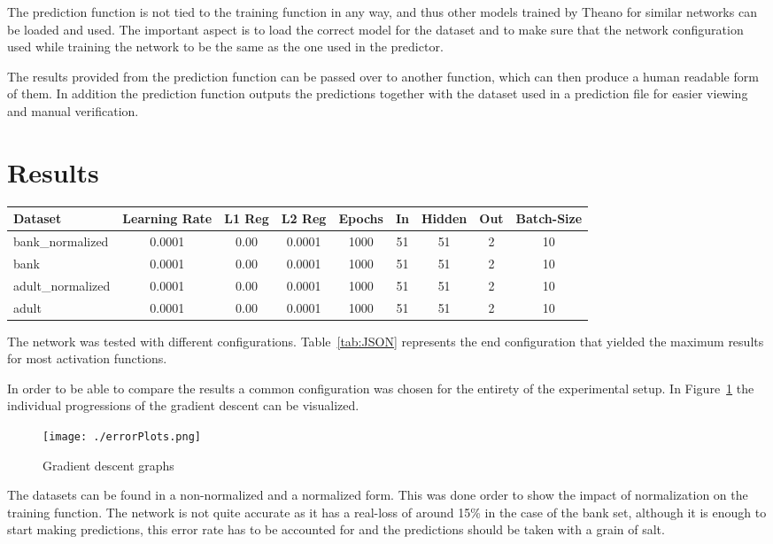 \documentclass[12pt]{article}
\begin{document}
The prediction function is not tied to the training function in any way, and thus other models trained by Theano for similar networks can be loaded and used. The important aspect is to load the correct model for the dataset and to make sure that the network configuration used while training the network to be the same as the one used in the predictor.

The results provided from the prediction function can be passed over to another function, which can then produce a human readable form of them. In addition the prediction function outputs the predictions together with the dataset used in a prediction file for easier viewing and manual verification.

\section{Results}
\label{sec:results}

\begin{table*}[ht]
    \centering
    \caption{Network Configuration\protect\footnotemark}
    \label{tab:JSON}
    \begin{tabular}{lcccccccc}\toprule
        Dataset & Learning Rate & L1 Reg & L2 Reg & Epochs & In & Hidden & Out & Batch-Size \\
        \midrule
        bank\_normalized & 0.0001 & 0.00 & 0.0001 & 1000 & 51 & 51 & 2 & 10 \\
        bank & 0.0001 & 0.00 & 0.0001 & 1000 & 51 & 51 & 2 & 10 \\
        adult\_normalized & 0.0001 & 0.00 & 0.0001 & 1000 & 51 & 51 & 2 & 10 \\
        adult & 0.0001 & 0.00 & 0.0001 & 1000 & 51 & 51 & 2 & 10 \\ 
        \bottomrule
    \end{tabular}
\end{table*}
The network was tested with different configurations. Table~\ref{tab:JSON} represents the end configuration that yielded the maximum results for most activation functions. 

In order to be able to compare the results a common configuration was chosen for the entirety of the experimental setup. In Figure~\ref{fig:graphs} the individual progressions of the gradient descent can be visualized.

\begin{figure}
    \texttt{[image: ./errorPlots.png]}
    \caption{Gradient descent graphs\protect\footnotemark} 
    \label{fig:graphs}
\end{figure}
The datasets can be found in a non-normalized and a normalized form. This was done order to show the impact of normalization on the training function. The network is not quite accurate as it has a real-loss of around 15\% in the case of the bank set, although it is enough to start making predictions, this error rate has to be accounted for and the predictions should be taken with a grain of salt. 
\end{document}
